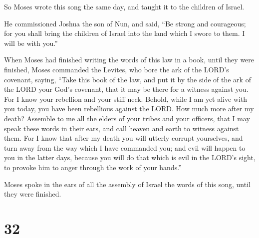  So Moses wrote this song the same day, and taught it to
the children of Israel.

 He commissioned Joshua the son of Nun, and said, ``Be
strong and courageous; for you shall bring the children of Israel into
the land which I swore to them. I will be with you.''

 When Moses had finished writing the words of this law in a
book, until they were finished,  Moses commanded the
Levites, who bore the ark of the LORD's covenant, saying, 
``Take this book of the law, and put it by the side of the ark of the
LORD your God's covenant, that it may be there for a witness against
you.  For I know your rebellion and your stiff neck.
Behold, while I am yet alive with you today, you have been rebellious
against the LORD. How much more after my death?  Assemble
to me all the elders of your tribes and your officers, that I may speak
these words in their ears, and call heaven and earth to witness against
them.  For I know that after my death you will utterly
corrupt yourselves, and turn away from the way which I have commanded
you; and evil will happen to you in the latter days, because you will do
that which is evil in the LORD's sight, to provoke him to anger through
the work of your hands.''

 Moses spoke in the ears of all the assembly of Israel the
words of this song, until they were finished.

\hypertarget{section-31}{%
\section{32}\label{section-31}}

